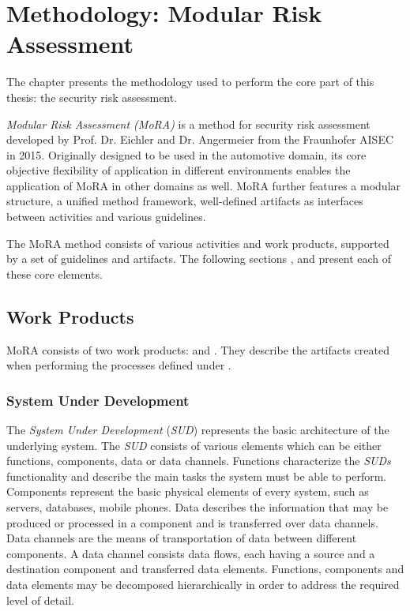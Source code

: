 \chapter{Methodology: Modular Risk Assessment}
\label{morachapter}

The chapter \textit{} presents the methodology used to perform the core part of this thesis: the security risk assessment. 

\textit{Modular Risk Assessment (MoRA)} is a method for security risk assessment developed by Prof. Dr. Eichler and Dr. Angermeier from the Fraunhofer AISEC in 2015. Originally designed to be used in the automotive domain, its core objective flexibility of application in different environments enables the application of MoRA in other domains as well. MoRA further features a modular structure, a unified method framework, well-defined artifacts as interfaces between activities and various guidelines.

The MoRA method consists of various activities and work products, supported by a set of guidelines and artifacts. The following sections \textit{}, \textit{} and \textit{} present each of these core elements.

\section{Work Products}
\label{workproducts}

MoRA consists of two work products: \textit{} and \textit{}. They describe the artifacts created when performing the processes defined under \textit{}.

\subsection{System Under Development}
\label{morasud} 

The \textit{System Under Development} (\textit{SUD}) represents the basic architecture of the underlying system. The \textit{SUD} consists of various elements which can be either functions, components, data or data channels. Functions characterize the \textit{SUDs} functionality and describe the main tasks the system must be able to perform. Components represent the basic physical elements of every system, such as servers, databases, mobile phones. Data describes the information that may be produced or processed in a component and is transferred over data channels. Data channels are the means of transportation of data between different components. A data channel consists data flows, each having a source and a destination component and transferred data elements. Functions, components and data elements may be decomposed hierarchically in order to address the required level of detail.

